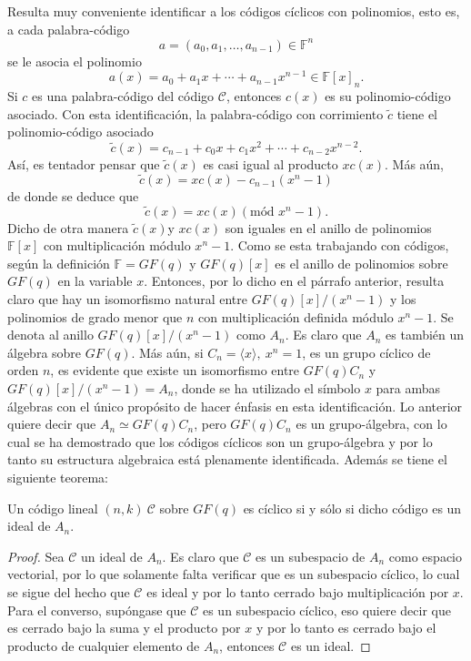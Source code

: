 Resulta muy conveniente identificar a los códigos cíclicos con polinomios, esto es, a cada palabra-código
\[ a = (a_0, a_1, \dots , a_{n-1}) \in \mathds{F}^n \] se le asocia el polinomio \[ a(x) = a_0 + a_1x+ \cdots + a_{n-1}x^{n-1} \in \mathds{F}[x]_n .\] Si $c$ es una palabra-código del código $\mathcal{C}$, entonces $c(x)$ es su polinomio-código asociado. Con esta identificación, la palabra-código con corrimiento $\tilde{c}$ tiene el polinomio-código asociado \[ \tilde{c}(x) = c_{n-1} + c_0x + c_1x^2 + \cdots + c_{n-2}x^{n-2}. \] Así, es tentador pensar que $\tilde{c}(x) $ es casi igual al producto $xc(x)$. Más aún, 
\[ \tilde{c}(x) = xc(x) - c_{n-1}(x^n -1)  \] de donde se deduce que \[ \tilde{c}(x) = xc(x) (\mbox{mód } x^n-1) .\] Dicho de otra manera $\tilde{c}(x)$y $xc(x)$ son iguales en el anillo de polinomios $\mathds{F}[x]$ con multiplicación módulo $x^n-1$. Como se esta trabajando con códigos, según la definición $\mathds{F} = GF(q) $ y $GF(q)[x]$ es el anillo de polinomios sobre $GF(q)$ en la variable $x$. Entonces, por lo dicho en el párrafo anterior, resulta claro que hay un isomorfismo natural entre $GF(q)[x]/(x^n-1)$ y los polinomios de grado menor que $n$ con multiplicación definida módulo $x^n-1$. Se denota al anillo $GF(q)[x]/(x^n-1)$ como $A_n$. Es claro que $A_n$ es también un álgebra sobre $GF(q)$. Más aún, si $C_n = \langle x \rangle,\ x^n =1$, es un grupo cíclico de orden $n$, es evidente que existe un isomorfismo entre $GF(q)C_n$ y $GF(q)[x]/(x^n-1) = A_n$, donde se ha utilizado el símbolo $x$ para ambas álgebras con el único propósito de hacer énfasis en esta identificación.
Lo anterior quiere decir que $A_n \simeq GF(q)C_n$, pero $GF(q)C_n$ es un grupo-álgebra, con lo cual se ha demostrado que los códigos cíclicos son un grupo-álgebra y por lo tanto su estructura algebraica está plenamente identificada. Además se tiene el siguiente teorema:
\begin{teorema}
Un código lineal $(n,k) \ \mathcal{C}$ sobre $GF(q)$ es cíclico si y sólo si dicho código es un ideal de $A_n$.
\end{teorema}
\begin{proof}
Sea $\mathcal{C}$ un ideal de $A_n$. Es claro que $\mathcal{C}$ es un subespacio de $A_n$ como espacio vectorial, por lo que solamente falta verificar que es un subespacio cíclico, lo cual se sigue del hecho que $\mathcal{C}$ es ideal y por lo tanto cerrado bajo multiplicación por $x$.
Para el converso, supóngase que $\mathcal{C}$ es un subespacio cíclico, eso quiere decir que es cerrado bajo la suma y el producto por $x$ y por lo tanto es cerrado bajo el producto de cualquier elemento de $A_n$, entonces $\mathcal{C}$ es un ideal.
\end{proof}

